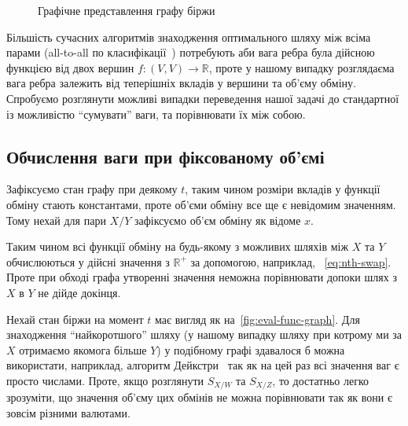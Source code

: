 \documentclass[14pt]{extarticle}
\begin{document}
\begin{figure}[h]
	\centering
	\caption{Графічне представлення графу біржи}\label{fig:amm-graph}
\end{figure}

Більшість сучасних алгоритмів знаходження оптимального шляху між всіма парами
(all-to-all по класифікації~\cite{deo1980shortest}) потребують аби вага ребра
була дійсною функцією від двох вершин $f: (V, V) \to \mathbb{R}$, проте у нашому випадку
розглядаєма вага ребра залежить від теперішніх вкладів у вершини та об'єму
обміну. Спробуємо розглянути можливі випадки переведення нашої задачі до
стандартної із можливістю ``сумувати'' ваги, та порівнювати їх між собою.

\subsection{Обчислення ваги при фіксованому об'ємі}

Зафіксуємо стан графу при деякому $t$, таким чином розміри вкладів у функції
обміну стають константами, проте об'єми обміну все ще є невідомим значенням.
Тому нехай для пари $X/Y$ зафіксуємо об'єм обміну як відоме $x$.

Таким чином всі функції обміну на будь-якому з можливих шляхів між $X$ та $Y$
обчислюються у дійсні значення з $\mathbb{R}^{+}$ за допомогою, наприклад,
~\eqref{eq:nth-swap}. Проте при обході графа утворенні значення неможна
порівнювати допоки шлях з $X$ в $Y$ не дійде докінця.

Нехай стан біржи на момент $t$ має вигляд як на~\ref{fig:eval-func-graph}. Для
знаходження ``найкоротшого'' шляху (у нашому випадку шляху при котрому ми за $X$
отримаємо якомога більше $Y$) у подібному графі здавалося б можна використати,
наприклад, алгоритм Дейкстри~\cite{dijkstra} так як на цей раз всі значення ваг
є просто числами. Проте, якщо розглянути $S_{X/W}$ та $S_{X/Z}$, то достатньо
легко зрозуміти, що значення об'єму цих обмінів не можна порівнювати так як вони
є зовсім різними валютами.
\end{document}
